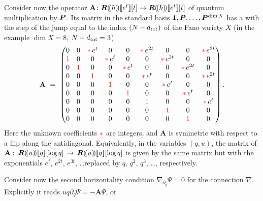 \documentclass[twoside,leqno]{article}
\numberwithin{equation}{section}
\theoremstyle{plain}
\theoremstyle{definition}
\begin{document}
Consider now  the operator $\mathbf{A} \colon \imageH(\!(\hbar)\!)\dbb{e^t}[t] \to \imageH(\!(\hbar)\!)\dbb{e^t}[t]$ of quantum multiplication by $\boldsymbol{P}$. Its  matrix in the standard basis 
$\mathbf{1}, \boldsymbol{P}, \ldots, \boldsymbol{P}^{\dim X}$ has a  with the step of the jump equal to the index $(N-d_{\operatorname{tot}})$ of the Fano variety $X$  
(in the example $\dim X = 8$, $N-d_{\operatorname{tot}} = 3$)
\[ 
\mathbf{A} \ = \  \begin{pmatrix} 0& 0 & {\color{red}{*}}\, e^{t} & 0 & 0 & {\color{red}{*}}\, e^{2t} & 0 & 0 & {\color{red}{*}}\, e^{3t}\\
\color{red}{1} & 0& 0 & {\color{red}{*}}\, e^{t} & 0 & 0 & {\color{red}{*}}\, e^{2t} & 0 & 0 \\
0 & \color{red}{1} & 0 & 0 & {\color{red}{*}} \, e^{t}  & 0 & 0 & {\color{red}{*}}\, e^{2t} & 0\\
0 & 0 & \color{red}{1} & 0 & 0 & {\color{red}{*}}\, e^{t} & 0 & 0 & {\color{red}{*}}\, e^{2t} \\
0 & 0 & 0 & \color{red}{1} & 0 & 0 & {\color{red}{*}}\, e^{t} &  0 & 0 \\
0 & 0 & 0 & 0 & \color{red}{1} & 0 & 0 & {\color{red}{*}}\, e^{t} & 0 \\
0 & 0 & 0 & 0 & 0 & \color{red}{1} & 0 & 0 & {\color{red}{*}}\, e^{t} \\
0 & 0 & 0 & 0 & 0 & 0  & \color{red}{1} & 0 & 0 \\
0 & 0 & 0 & 0 & 0 & 0  & 0 & \color{red}{1} & 0
\end{pmatrix}. 
\]
Here the unknown coefficients ${\color{red}{*}}$ are integers, and $\mathbf{A}$ is symmetric with respect to a flip along the antidiagonal. Equivalently, in the variables $(q,u)$, the matrix of $\mathbf{A} \, \colon \, \imageH(\!(u)\!)\dbb{q}[\log q] \, \to \, 
\imageH(\!(u)\!)\dbb{q}[\log q]$ is given by the same matrix but with the exponentials 
$e^{t}$, $e^{2t}$, $e^{3t}$, \ldots replaced by $q$, $q^2$, $q^3$, \ldots, respectively.

\medskip


Consider now the second horizontality condition $\nabla_{\partial_{q}}\Psi = 0$ for the connection $\nabla$. Explicitly it reads 
$uq\partial_{q}\Psi = - \mathbf{A}\Psi$, or
\end{document}
